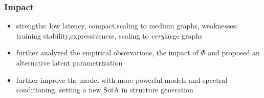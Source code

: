 \documentclass[./presentation.tex]{subfiles}
\begin{document}

\begin{frame}[label=working,t]
  \frametitle{Impact}
  \begin{itemize}
    \item strengths: low latency\checkmark, compact\checkmark,scaling to medium graphs\checkmark, weaknesses: training stability,expressiveness, scaling to \emph{very}large graphs
    \item \citep{vignacTopNEquivariantSet2021d} further analyzed the empirical observations, the impact of $\Phi$ and proposed an alternative latent parametrization
    \item \citep{martinkusSPECTRESpectralConditioning2022b} further improve the model with more powerful models and spectral conditioning, setting a new SotA in structure generation
  \end{itemize}
\end{frame}
\end{document}

